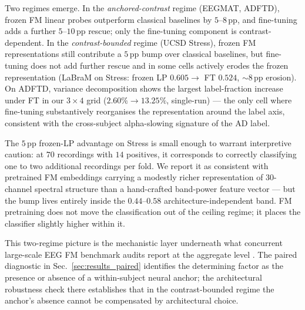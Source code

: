 Two regimes emerge. In the \emph{anchored-contrast} regime (EEGMAT,
ADFTD), frozen FM linear probes outperform classical baselines by
$5$--$8$\,pp, and fine-tuning adds a further $5$--$10$\,pp rescue;
only the fine-tuning component is contrast-dependent. In the
\emph{contrast-bounded} regime (UCSD Stress), frozen FM
representations still contribute a $5$\,pp bump over classical
baselines, but fine-tuning does not add further rescue and in some
cells actively erodes the frozen representation (LaBraM on Stress:
frozen LP $0.605 \to$ FT $0.524$, $\sim\!8$\,pp erosion). On ADFTD,
variance decomposition shows the largest label-fraction increase
under FT in our $3 \times 4$ grid ($2.60\% \to 13.25\%$, single-run)
--- the only cell where fine-tuning substantively reorganises the
representation around the label axis, consistent with the
cross-subject alpha-slowing signature of the AD label.

The $5$\,pp frozen-LP advantage on Stress is small enough to warrant
interpretive caution: at $70$ recordings with $14$ positives, it
corresponds to correctly classifying one to two additional
recordings per fold. We report it as consistent with pretrained FM
embeddings carrying a modestly richer representation of 30-channel
spectral structure than a hand-crafted band-power feature vector ---
but the bump lives entirely inside the $0.44$--$0.58$
architecture-independent band. FM pretraining does not move the
classification out of the ceiling regime; it places the classifier
slightly higher within it.

This two-regime picture is the mechanistic layer underneath what
concurrent large-scale EEG FM benchmark audits report at the
aggregate level
\citep{eegbench2025,kauffmann2025critique,eegfmbench2025,adabrain2025}.
The paired diagnostic in Sec.~\ref{sec:results_paired} identifies
the determining factor as the presence or absence of a within-subject
neural anchor; the architectural robustness check there establishes
that in the contrast-bounded regime the anchor's absence cannot be
compensated by architectural choice.
